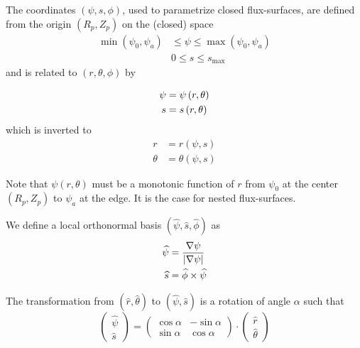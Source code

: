 The coordinates $\left( \psi,s,\phi\right) $, used to parametrize closed
flux-surfaces, are defined from the origin $\left( R_{p},Z_{p}\right) $ on
the (closed) space 
\begin{align}
\min\left( \psi_{0},\psi_{a}\right) & \leq\psi\leq\max\left( \psi
_{0},\psi_{a}\right) \\
& 0\leq s\leq s_{\max}
\end{align}
and is related to $\left( r,\theta,\phi\right) $ by

\begin{align}
\psi & =\psi\left( r,\theta\right)  \label{psisdef} \\
s & =s\left( r,\theta\right)  \notag
\end{align}
which is inverted to 
\begin{align*}
r & =r\left( \psi,s\right) \\
\theta & =\theta\left( \psi,s\right)
\end{align*}

Note that $\psi\left( r,\theta\right) $ must be a monotonic function of $r$
from $\psi_{0}$ at the center $\left( R_{p},Z_{p}\right) $ to $\psi_{a}$ at
the edge. It is the case for nested flux-surfaces.

We define a local orthonormal basis $\left( \widehat{\psi},\widehat {s},%
\widehat{\phi}\right) $ as 
\begin{align}
\widehat{\psi} & =\frac{\nabla\psi}{\left| \nabla\psi\right| } \\
\widehat{s} & =\widehat{\phi}\times\widehat{\psi}  \notag
\end{align}

The transformation from $\left( \widehat{r},\widehat{\theta}\right) $ to $%
\left( \widehat{\psi},\widehat{s}\right) $ is a rotation of angle $\alpha$
such that 
\begin{equation}
\left( 
\begin{array}{l}
\widehat{\psi} \\ 
\widehat{s}%
\end{array}
\right) =\left( 
\begin{array}{ll}
\cos\alpha & -\sin\alpha \\ 
\sin\alpha & \cos\alpha%
\end{array}
\right) \cdot\left( 
\begin{array}{l}
\widehat{r} \\ 
\widehat{\theta}%
\end{array}
\right)
\end{equation}

